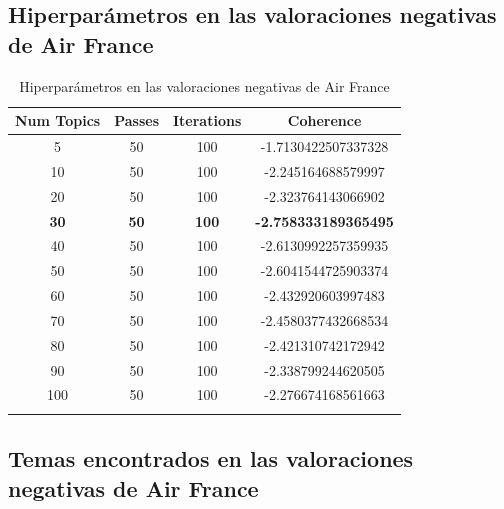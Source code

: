 \documentclass{report}
\begin{document}
            \clearpage\subsection{Hiperparámetros en las valoraciones negativas de Air France}
                \label{tab:hiperparametros_air_france_negativas}
                \begin{longtable}{|c|c|c|c|}
                    \hline
                    \textbf{Num Topics} & \textbf{Passes} & \textbf{Iterations} & \textbf{Coherence} \\
                    \hline
                    5 & 50 & 100 & -1.7130422507337328 \\
                    \hline
                    10 & 50 & 100 & -2.245164688579997 \\
                    \hline
                    20 & 50 & 100 & -2.323764143066902 \\
                    \hline
                    \textbf{30} & \textbf{50} & \textbf{100} & \textbf{-2.758333189365495} \\
                    \hline
                    40 & 50 & 100 & -2.6130992257359935 \\
                    \hline
                    50 & 50 & 100 & -2.6041544725903374 \\
                    \hline
                    60 & 50 & 100 & -2.432920603997483 \\
                    \hline
                    70 & 50 & 100 & -2.4580377432668534 \\
                    \hline
                    80 & 50 & 100 & -2.421310742172942 \\
                    \hline
                    90 & 50 & 100 & -2.338799244620505 \\
                    \hline
                    100 & 50 & 100 & -2.276674168561663 \\
                    \hline
                    \caption{Hiperparámetros en las valoraciones negativas de Air France}
                \end{longtable}   
            \clearpage\subsection{Temas encontrados en las valoraciones negativas de Air France}
                \label{tab:temas_air_france_negativas}
\end{document}
